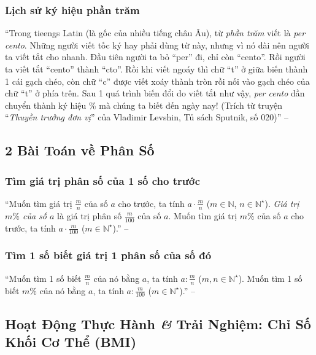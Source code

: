 \documentclass{article}
\numberwithin{equation}{section}
\begin{document}
\subsubsection{Lịch sử ký hiệu phần trăm}
``Trong tieengs Latin (là gốc của nhiều tiếng châu Âu), từ \textit{phần trăm} viết là \textit{per cento}. Những người viết tốc ký hay phải dùng từ này, nhưng vì nó dài nên người ta viết tắt cho nhanh. Đầu tiên người ta bỏ ``per'' đi, chỉ còn ``cento''. Rồi người ta viết tắt ``cento'' thành ``cto''. Rồi khi viết ngoáy thì chữ ``t'' ở giữa biến thành 1 cái gạch chéo, còn chữ ``c'' được viết xoáy thành tròn rồi nối vào gạch chéo của chữ ``t'' ở phía trên. Sau 1 quá trình biến đổi do viết tắt như vậy, \textit{per cento} dần chuyển thành ký hiệu \% mà chúng ta biết đến ngày nay! (Trích từ truyện ``\textit{Thuyền trưởng đơn vị}'' của Vladimir Levshin, Tủ sách Sputnik, số 020)'' -- \cite[p. 66]{Thai_Anh_Dat_Ha_Loan_Nam_Quang_Toan_6_tap_2}

\subsection{2 Bài Toán về Phân Số}

\subsubsection{Tìm giá trị phân số của 1 số cho trước}
``Muốn tìm giá trị $\frac{m}{n}$ của số $a$ cho trước, ta tính $a\cdot\frac{m}{n}$ ($m\in\mathbb{N}$, $n\in\mathbb{N}^\star$). \emph{Giá trị $m\%$ của số $a$} là giá trị phân số $\frac{m}{100}$ của số $a$. Muốn tìm giá trị $m\%$ của số $a$ cho trước, ta tính $a\cdot\frac{m}{100}$ ($m\in\mathbb{N}^\star$).'' -- \cite[p. 68]{Thai_Anh_Dat_Ha_Loan_Nam_Quang_Toan_6_tap_2}

\subsubsection{Tìm 1 số biết giá trị 1 phân số của số đó}
``Muốn tìm 1 số biết $\frac{m}{n}$ của nó bằng $a$, ta tính $a:\frac{m}{n}$ ($m,n\in\mathbb{N}^\star$). Muốn tìm 1 số biết $m\%$ của nó bằng $a$, ta tính $a:\frac{m}{100}$ ($m\in\mathbb{N}^\star$).'' -- \cite[p. 68]{Thai_Anh_Dat_Ha_Loan_Nam_Quang_Toan_6_tap_2}

\subsection{Hoạt Động Thực Hành \textit{\&} Trải Nghiệm: Chỉ Số Khối Cơ Thể (BMI)}
\end{document}
